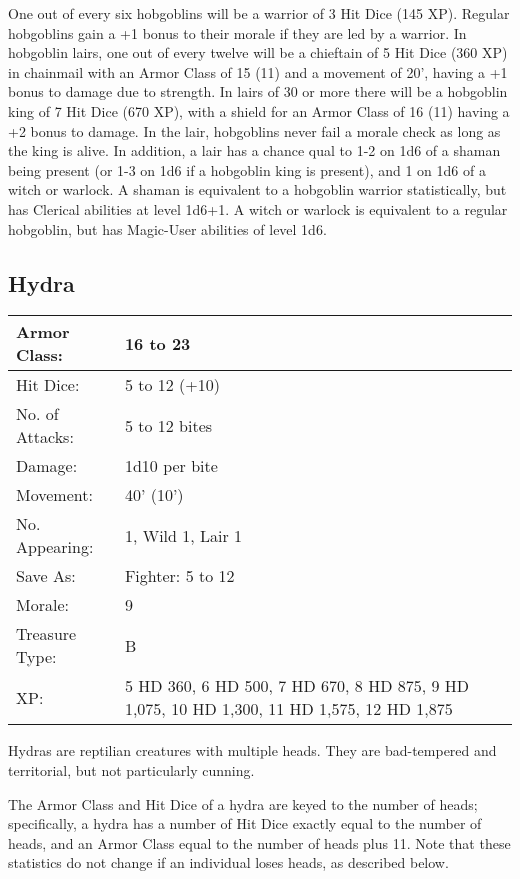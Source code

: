 \documentclass[a4paper,twoside,openany,10pt]{book}
\begin{document}
\begin{multicols}{2}
One out of every six hobgoblins will be a warrior of 3 Hit Dice (145 XP). Regular hobgoblins gain a +1 bonus to their morale if they are led by a warrior. In hobgoblin lairs, one out of every twelve will be a chieftain of 5 Hit Dice (360 XP) in chainmail with an Armor Class of 15 (11) and a movement of 20', having a +1 bonus to damage due to strength. In lairs of 30 or more there will be a hobgoblin king of 7 Hit Dice (670 XP), with a shield for an Armor Class of 16 (11) having a +2 bonus to damage. In the lair, hobgoblins never fail a morale check as long as the king is alive. In addition, a lair has a chance qual to 1-2 on 1d6 of a shaman being present (or 1-3 on 1d6 if a hobgoblin king is present), and 1 on 1d6 of a witch or warlock. A shaman is equivalent to a hobgoblin warrior statistically, but has Clerical abilities at level 1d6+1. A witch or warlock is equivalent to a regular hobgoblin, but has Magic-User abilities of level 1d6.


\subsection*{Hydra}\label{hydra}
	
\begin{tabularx}{0.50\textwidth}{@{}lX@{}}
Armor Class: & 16 to 23 \\\hline
Hit Dice: & 5 to 12 (+10) \\\hline
No. of Attacks: & 5 to 12 bites \\\hline
Damage: & 1d10 per bite \\\hline
Movement: & 40' (10') \\\hline
No. Appearing: & 1, Wild 1, Lair 1 \\\hline
Save As: & Fighter: 5 to 12 \\\hline
Morale: & 9 \\\hline
Treasure Type: & B \\\hline
XP: & 5 HD 360, 6 HD 500, 7 HD 670, 8 HD 875, 9 HD 1,075, 10 HD 1,300,
11 HD 1,575, 12 HD 1,875 \\\hline
\end{tabularx}\medskip

Hydras are reptilian creatures with multiple heads. They are bad-tempered and territorial, but not particularly cunning. 

The Armor Class and Hit Dice of a hydra are keyed to the number of heads; specifically, a hydra has a number of Hit Dice exactly equal to the number of heads, and an Armor Class equal to the number of heads plus 11. Note that these statistics do not change if an individual loses heads, as described below.


\end{multicols}
\end{document}
